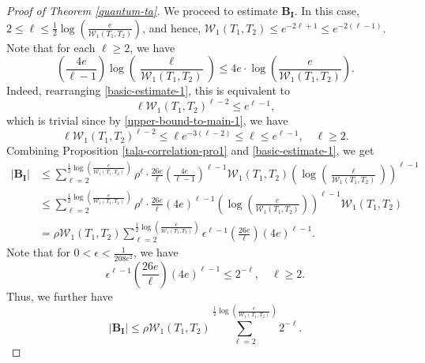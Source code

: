 \documentclass{amsbook}
\theoremstyle{definition}
\theoremstyle{remark}
\numberwithin{section}{chapter}
\numberwithin{equation}{chapter}
\newcommand{\1}{\mathbf{1}}
\begin{document}
\begin{proof}[Proof of Theorem \ref{quantum-ta}]
We proceed to estimate $\mathbf{B_{I}}$. In this case, $2\leq \ell\leq \frac 12\log\left(\frac{e}{\mathcal{W}_{1}(T_1,T_2)}\right)$, and hence, $\mathcal{W}_{1}(T_1,T_2)\leq e^{-2\ell+1}\leq e^{-2(\ell-1)}$. 
Note that for each $\ell \geq 2$, we have
\begin{equation}\label{basic-estimate-1}
	\left(\frac{4e}{\ell-1}\right)\log\left(\frac{\ell}{\mathcal{W}_{1}(T_1,T_2)}\right)\leq 4e\cdot\log\left(\frac{e}{\mathcal{W}_{1}(T_1,T_2)}\right).
\end{equation}
Indeed, rearranging \eqref{basic-estimate-1}, this is equivalent to
\[
\ell \mathcal{W}_{1}(T_1,T_2)^{\ell-2}\leq e^{\ell-1},
\]
which is trivial since  by \eqref{upper-bound-to-main-1},  we have
\[
\ell \mathcal{W}_{1}(T_1,T_2)^{\ell-2}\leq \ell e^{-3(\ell-2)}\leq \ell\leq e^{\ell-1},
\quad \ell\geq 2.\]
Combining Proposition \ref{tala-correlation-pro1} and \eqref{basic-estimate-1}, we get
\begin{equation*}\label{estimate-on-b1-2}
	\begin{split}
		|\mathbf{B_{I}}|&\leq \sum_{\ell=2}^{\frac 12\log\left(\frac{e}{\mathcal{W}_{1}(T_1,T_2)}\right)}\rho^{\ell}\cdot\frac{26e}{\ell}\left(\frac{4e}{\ell-1}\right)^{\ell-1}\mathcal{W}_{1}(T_1,T_2)\left(\log\left(\frac{\ell}{\mathcal{W}_{1}(T_1,T_2)}\right)\right)^{\ell-1}\\
&\leq \sum_{\ell=2}^{\frac 12\log\left(\frac{e}{\mathcal{W}_{1}(T_1,T_2)}\right)}\rho^{\ell}\cdot\frac{26e}{\ell}({4e})^{\ell-1}\left(\log\left(\frac{e}{\mathcal{W}_{1}(T_1,T_2)}\right)\right)^{\ell-1}\mathcal{W}_{1}(T_1,T_2)\\
		&= \rho \mathcal{W}_{1}(T_1,T_2)\sum_{\ell=2}^{\frac 12\log\left(\frac{e}{\mathcal{W}_{1}(T_1,T_2)}\right)}\epsilon^{\ell-1}\left(\frac{26e}{\ell}\right)(4e)^{\ell-1}.
	\end{split}
\end{equation*}
Note that for  $0<\epsilon<\frac{1}{208e^{2}}$, we have
\begin{equation*}
	\epsilon^{\ell-1}\left(\frac{26e}{\ell}\right)(4e)^{\ell-1}\leq 2^{-\ell},\quad \ell\geq 2.
\end{equation*}
Thus, we further have
\begin{equation}\label{estimate-on-b1-3}
	|\mathbf{B_{I}}|\leq \rho \mathcal{W}_{1}(T_1,T_2)\sum_{\ell=2}^{\frac 12\log\left(\frac{e}{\mathcal{W}_{1}(T_1,T_2)}\right)}2^{-\ell}.
\end{equation}


\end{proof}
\end{document}
